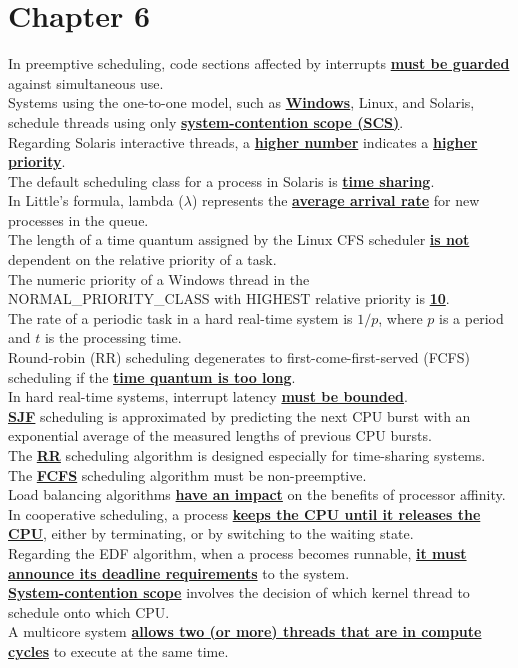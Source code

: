 \documentclass[10pt]{article}
\newcommand{\qw}[1]{\textbf{\ul{#1}}}
\begin{document}
\section*{\centering Chapter 6}
In preemptive scheduling, code sections affected by interrupts \qw{must be guarded} against simultaneous use.\\[2mm]
Systems using the one-to-one model, such as \qw{Windows}, Linux, and Solaris, schedule threads using only \qw{system-contention scope (SCS)}.\\[2mm]
Regarding Solaris interactive threads, a \qw{higher number} indicates a \qw{higher priority}.\\[2mm]
The default scheduling class for a process in Solaris is \qw{time sharing}.\\[2mm]
In Little's formula, lambda ($\lambda$) represents the \qw{average arrival rate} for new processes in the queue.\\[2mm]
The length of a time quantum assigned by the Linux CFS scheduler \qw{is not} dependent on the relative priority of a task.\\[2mm]
The numeric priority of a Windows thread in the NORMAL_PRIORITY_CLASS with HIGHEST relative priority is \qw{10}.\\[2mm]
The rate of a periodic task in a hard real-time system is \qw{$1/p$}, where $p$ is a period and $t$ is the processing time.\\[2mm]
Round-robin (RR) scheduling degenerates to first-come-first-served (FCFS) scheduling if the \qw{time quantum is too long}.\\[2mm]
In hard real-time systems, interrupt latency \qw{must be bounded}.\\[2mm]
\qw{SJF} scheduling is approximated by predicting the next CPU burst with an exponential average of the measured lengths of previous CPU bursts.\\[2mm]
The \qw{RR} scheduling algorithm is designed especially for time-sharing systems.\\[2mm]
The \qw{FCFS} scheduling algorithm must be non-preemptive.\\[2mm]
Load balancing algorithms \qw{have an impact} on the benefits of processor affinity.\\[2mm]
In cooperative scheduling, a process \qw{keeps the CPU until it releases the CPU}, either by terminating, or by switching to the waiting state.\\[2mm]
Regarding the EDF algorithm, when a process becomes runnable, \qw{it must announce its deadline requirements} to the system.\\[2mm]
\qw{System-contention scope} involves the decision of which kernel thread to schedule onto which CPU.\\[2mm]
A multicore system \qw{allows two (or more) threads that are in compute cycles} to execute at the same time.
\newpage
\end{document}
